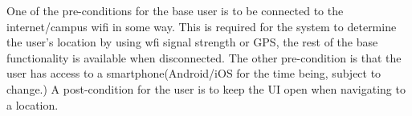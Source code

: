 {One of the pre-conditions for the base user is to be connected to the internet/campus wifi in some way. This is required for the system to determine the user's location by using wfi signal strength or GPS, the rest of the base functionality is available when disconnected. The other pre-condition is that the user has access to a smartphone(Android/iOS for the time being, subject to change.) }
{A post-condition for the user is to keep the UI open when navigating to a location.}

